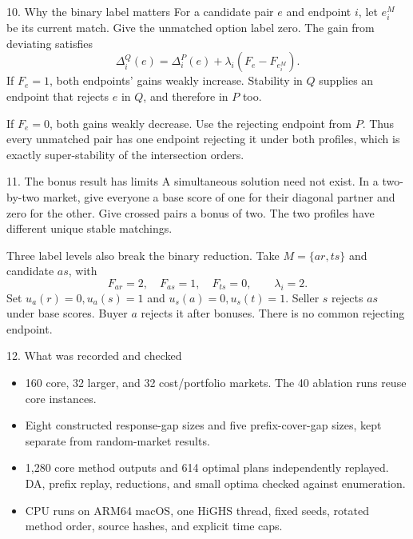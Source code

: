\begin{frame}[t,label=bonus-proof]{10. Why the binary label matters}
\small
For a candidate pair $e$ and endpoint $i$, let $e_i^M$ be its current match.
Give the unmatched option label zero. The gain from deviating satisfies
\[
 \Delta_i^Q(e)=\Delta_i^P(e)+\lambda_i(F_e-F_{e_i^M}).
\]
If $F_e=1$, both endpoints' gains weakly increase. Stability in $Q$ supplies
an endpoint that rejects $e$ in $Q$, and therefore in $P$ too.

\medskip
If $F_e=0$, both gains weakly decrease. Use the rejecting endpoint from $P$.
Thus every unmatched pair has one endpoint rejecting it under both profiles,
which is exactly super-stability of the intersection orders.
\end{frame}

\begin{frame}[t,label=bonus-limit]{11. The bonus result has limits}
\small
A simultaneous solution need not exist. In a two-by-two market, give everyone
a base score of one for their diagonal partner and zero for the other.
Give crossed pairs a bonus of two. The two profiles have different unique stable matchings.

\medskip
Three label levels also break the binary reduction. Take
$M=\{ar,ts\}$ and candidate $as$, with
\[
 F_{ar}=2,\quad F_{as}=1,\quad F_{ts}=0,\qquad\lambda_i=2.
\]
Set $u_a(r)=0,u_a(s)=1$ and $u_s(a)=0,u_s(t)=1$.
Seller $s$ rejects $as$ under base scores. Buyer $a$ rejects it after bonuses.
There is no common rejecting endpoint.
\end{frame}

\begin{frame}[t,label=repro]{12. What was recorded and checked}
\small
\begin{itemize}
\setlength{\itemsep}{5pt}
\item 160 core, 32 larger, and 32 cost/portfolio markets.
The 40 ablation runs reuse core instances.
\item Eight constructed response-gap sizes and five prefix-cover-gap sizes,
kept separate from random-market results.
\item 1,280 core method outputs and 614 optimal plans independently replayed.
DA, prefix replay, reductions, and small optima checked against enumeration.
\item CPU runs on ARM64 macOS, one HiGHS thread, fixed seeds,
rotated method order, source hashes, and explicit time caps.
\end{itemize}
\end{frame}

